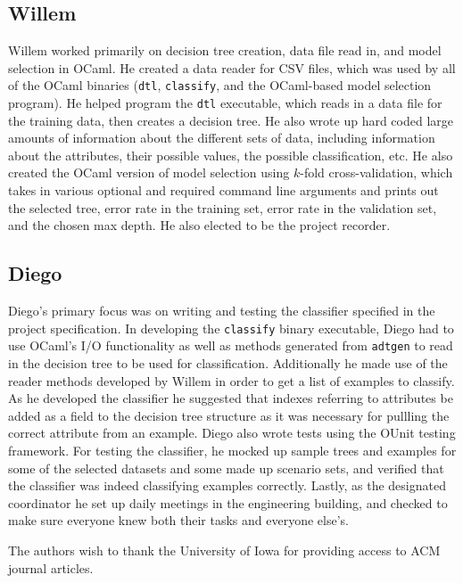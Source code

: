 \documentclass[screen, authorversion, nonacm, sigconf]{acmart}
\begin{document}
\subsection{Willem}

Willem worked primarily on decision tree creation, data file read in, and model selection in OCaml. He created a data reader for CSV files, which was used by all of the OCaml binaries (\texttt{dtl}, \texttt{classify}, and the OCaml-based model selection program). He helped program the \texttt{dtl} executable, which reads in a data file for the training data, then creates a decision tree. He also wrote up hard coded large amounts of information about the different sets of data, including information about the attributes, their possible values, the possible classification, etc. He also created the OCaml version of model selection using $k$-fold cross-validation, which takes in various optional and required command line arguments and prints out the selected tree, error rate in the training set, error rate in the validation set, and the chosen max depth. He also elected to be the project recorder.

\subsection{Diego}

Diego's primary focus was on writing and testing the classifier specified in the project specification. In developing the \texttt{classify} binary executable, Diego had to use OCaml's I/O functionality as well as methods generated from \texttt{adtgen} to read in the decision tree to be used for classification. Additionally he made use of the reader methods developed by Willem in order to get a list of examples to classify. As he developed the classifier he suggested that indexes referring to attributes be added as a field to the decision tree structure as it was necessary for pullling the correct attribute from an example. Diego also wrote tests using the OUnit testing framework. For testing the classifier, he mocked up sample trees and examples for some of the selected datasets and some made up scenario sets, and verified that the classifier was indeed classifying examples correctly. Lastly, as the designated coordinator he set up daily meetings in the engineering building, and checked to make sure everyone knew both their tasks and everyone else's.

\begin{acks}
The authors wish to thank the University of Iowa for providing access to ACM journal articles.
\end{acks}
\end{document}

